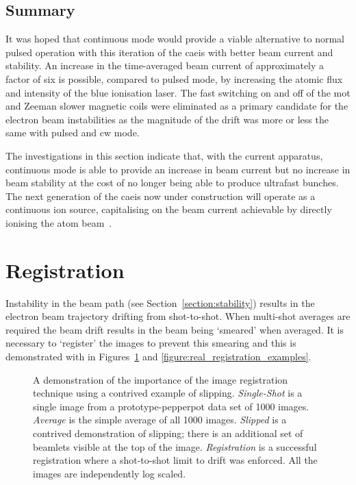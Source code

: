 \subsection{Summary}

It was hoped that continuous mode would provide a viable alternative to normal pulsed operation with this iteration of the \gls{caeis} with better beam current and stability.
An increase in the time-averaged beam current of approximately a factor of six is possible, compared to pulsed mode, by increasing the atomic flux and intensity of the blue ionisation laser.
The fast switching on and off of the \gls{mot} and Zeeman slower magnetic coils were eliminated as a primary candidate for the electron beam instabilities as the magnitude of the drift was more or less the same with pulsed and \gls{cw} mode.

The investigations in this section indicate that, with the current apparatus, continuous mode is able to provide an increase in beam current but no increase in beam stability at the cost of no longer being able to produce ultrafast bunches.
The next generation of the \gls{caeis} now under construction will operate as a continuous ion source, capitalising on the beam current achievable by directly ionising the atom beam~\cite{mcculloch_heralded_2018}.

\section{Registration}\label{section:registration}

Instability in the beam path (see Section~\ref{section:stability}) results in the electron beam trajectory drifting from shot-to-shot.
When multi-shot averages are required the beam drift results in the beam being `smeared' when averaged.
It is necessary to `register' the images to prevent this smearing and this is demonstrated with in Figures~\ref{figure:registration_examples} and \ref{figure:real_registration_examples}.

\begin{figure}
    \center
    
    \caption[Contrived image registration example.]{A demonstration of the importance of the image registration technique using a contrived example of slipping. \emph{Single-Shot} is a single image from a prototype-pepperpot data set of 1000 images. \emph{Average} is the simple average of all 1000 images. \emph{Slipped} is a contrived demonstration of slipping; there is an additional set of beamlets visible at the top of the image. \emph{Registration} is a successful registration where a shot-to-shot limit to drift was enforced. All the images are independently log scaled.}
    \label{figure:registration_examples}
\end{figure}

